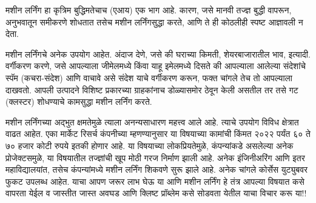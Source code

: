 मशीन लर्निंग हा कृत्रिम बुद्धिमतेचाच (एआय) एक भाग आहे. कारण, जसे मानवी तज्ज्ञ बुद्धी वापरून, अनुभवातून समीकरणे शोधतात तसेच मशीन लर्निंगसुद्धा करते, आणि ते ही कोठलीही स्पष्ट आज्ञावली न देता.

मशीन लर्निंगचे अनेक उपयोग आहेत. अंदाज देणे, जसे की  घराच्या किमती, शेयरबाजारातील भाव, इत्यादी. वर्गीकरण करणे, जसे आपल्याला जीमेलमध्ये किंवा याहू इमेलमध्ये दिसते की आपल्याला आलेल्या संदेशांचे स्पॅम (कचरा-संदेश) आणि वाचावे असे संदेश याचे वर्गीकरण करून, फक्त चांगले तेच तो आपल्याला दाखवतो. आपली उत्पादने विशिष्ट प्रकारच्या ग्राहकांनाच डोळ्यासमोर ठेवून केली असतील तर तसे गट (क्लस्टर) शोधण्याचे कामसुद्धा मशीन लर्निंग करते.

मशीन लर्निंगच्या अद्भुत क्षमतेमुळे त्याला अनन्यसाधारण महत्त्व आले आहे. त्याचे उपयोग विविध क्षेत्रात वाढत आहेत. एका मार्केट रिसर्च कंपनीच्या म्हणण्यानुसार या विषयाच्या कामांची किंमत २०२२ पर्यंत ६० ते ७० हजार कोटी रुपये इतकी होणार आहे. या विषयाच्या लोकप्रियतेमुळे, कंपन्यांकडे असलेल्या अनेक प्रोजेक्टसमुळे, या विषयातील तज्ज्ञांची खूप मोठी गरज निर्माण झाली आहे. अनेक इंजिनीअरिंग आणि इतर महाविद्यालयांत, तसेच कंपन्यांमध्ये मशीन लर्निंग शिकवणे सुरू झाले आहे. अनेक चांगले कोर्सेस युट्युबवर फुकट उपलब्ध आहेत. याचा आपण जरूर लाभ घेऊ या आणि मशीन लर्निंग हे तंत्र आपल्या विषयात कसे वापरता येईल व जास्तीत जास्त अवघड आणि क्लिष्ट प्रॉब्लेम कसे सोडवता येतील याचा विचार करू या!!